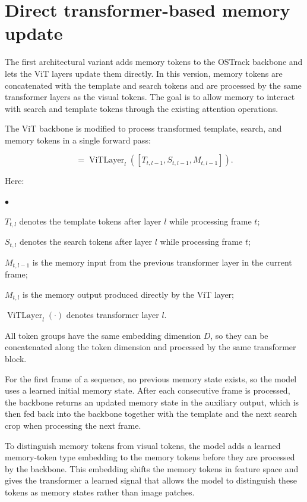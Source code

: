 \documentclass[bachelorthesis]{fer}
\numberwithin{equation}{chapter}
\newcommand{\FormulaNotationWith}[2]{%
    \vspace{-0.6em}
    \noindent\hspace*{1.2em}%
    \begin{minipage}{0.90\textwidth}
        \footnotesize
        #1
        \vspace{0.2em}
        \begin{list}{\(\bullet\)}{
            \setlength{\leftmargin}{1.4em}
            \setlength{\labelwidth}{0.8em}
            \setlength{\labelsep}{0.5em}
            \setlength{\itemsep}{0.05em}
            \setlength{\parsep}{0pt}
            \setlength{\topsep}{0.25em}
            \setlength{\partopsep}{0pt}
        }
            #2
        \end{list}
    \end{minipage}
    \par
    \vspace{0.8em}

}
\begin{document}
    \section{Direct transformer-based memory update}\label{direct-transformer-based-memory-update}

    The first architectural variant adds memory tokens to the OSTrack backbone and lets the
    ViT layers update them directly. In this version, memory tokens are concatenated with
    the template and search tokens and are processed by the same transformer layers as the
    visual tokens. The goal is to allow memory to interact with search and template tokens through the existing attention operations.

    The ViT backbone is modified to process transformed template,
    search, and memory tokens in a single forward pass:

    \begin{equation}
    [T_{t,l}, S_{t,l}, M_{t,l}]
        =
        \operatorname{ViTLayer}_l
        \left(
        [T_{t,l-1}, S_{t,l-1}, M_{t,l-1}]
        \right).
    \end{equation}
    \FormulaNotationWith{Here:}{
        \item \(T_{t,l}\) denotes the template tokens after layer \(l\) while processing frame \(t\);
        \item \(S_{t,l}\) denotes the search tokens after layer \(l\) while processing frame \(t\);
        \item \(M_{t,l-1}\) is the memory input from the previous transformer layer in the current frame;
        \item \(M_{t,l}\) is the memory output produced directly by the ViT layer;
        \item \(\operatorname{ViTLayer}_l(\cdot)\) denotes transformer layer \(l\).
    }

    All token groups have the same embedding dimension \(D\), so they can be concatenated
    along the token dimension and processed by the same transformer block.

    For the first frame of a sequence, no previous memory state exists, so the model uses a learned initial memory state.
    After each consecutive frame is processed, the backbone returns an updated memory state in the auxiliary output,
    which is then fed back into the backbone together with the template and the next search crop when processing the next frame.


    To distinguish memory tokens from visual tokens, the model adds a learned memory-token
    type embedding to the memory tokens before they are processed by the backbone. This
    embedding shifts the memory tokens in feature space and gives the transformer a learned
    signal that allows the model to distinguish these tokens as memory states rather than image patches.
\end{document}
